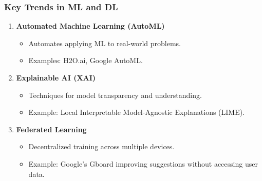 \documentclass[aspectratio=169]{beamer}
\begin{document}
\begin{frame}[fragile]
    \frametitle{Key Trends in ML and DL}
    
    \begin{enumerate}
        \item \textbf{Automated Machine Learning (AutoML)}
            \begin{itemize}
                \item Automates applying ML to real-world problems.
                \item Examples: H2O.ai, Google AutoML.
            \end{itemize}
        
        \item \textbf{Explainable AI (XAI)}
            \begin{itemize}
                \item Techniques for model transparency and understanding.
                \item Example: Local Interpretable Model-Agnostic Explanations (LIME).
            \end{itemize}
        
        \item \textbf{Federated Learning}
            \begin{itemize}
                \item Decentralized training across multiple devices.
                \item Example: Google’s Gboard improving suggestions without accessing user data.
            \end{itemize}
    \end{enumerate}
\end{frame}
\end{document}
